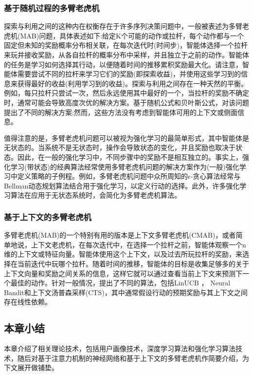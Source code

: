 \subsubsection{基于随机过程的多臂老虎机}
探索与利用之间的这种内在权衡存在于许多序列决策问题中，一般被表述为多臂老虎机(MAB)问题，具体表述如下:给定K个可能的动作或拉杆，每个动作都与一个固定但未知的奖励概率分布相关联，在每次迭代时(时间步)，智能体选择一个拉杆来玩并接收奖励，从各自拉杆的概率分布中采样，并且独立于之前的动作。智能体的任务是学习如何选择其行动，以便随着时间的推移累积奖励最大化。请注意，智能体需要尝试不同的拉杆来学习它们的奖励(即探索收益)，并使用这些学习到的信息来获得最好的收益(利用学习到的收益)。探索与利用之间存在一种天然的平衡。例如，每只拉杆只尝试一次，然后永远使用其中最好的一个，当拉杆的奖励不确定时，通常可能会导致高度次优的解决方案。基于随机公式和贝叶斯公式，对该问题提出了不同的解决方案;然而，这些方法没有考虑到智能体可用的上下文或侧面信息。\par
值得注意的是，多臂老虎机问题可以被视为强化学习的最简单形式，其中智能体是无状态的。当系统不是无状态时，操作会导致状态的变化，并且奖励也取决于状态。因此，在一般的强化学习中，不同步骤中的奖励不是相互独立的。事实上，强化学习(带状态)的经典算法经常使用多臂老虎机问题的解决方案作为(一般)强化学习中定义策略的子例程。例如，多臂老虎机问题中众所周知的$\epsilon$-贪心算法经常与Bellman动态规划算法结合用于强化学习，以定义行动的选择。此外，许多强化学习算法在应用于无状态系统时，会简化为多臂老虎机算法。

\subsubsection{基于上下文的多臂老虎机}
多臂老虎机(MAB)的一个特别有用的版本是上下文多臂老虎机(CMAB)，或者简单地说，上下文老虎机，在每次迭代中，在选择一个拉杆之前，智能体观察一个n维的上下文或特征向量。智能体使用这个上下文，以及过去所玩拉杆的奖励，来选择在当前迭代中玩哪个拉杆。随着时间的推移，智能体的目标是收集足够多的关于上下文向量和奖励之间关系的信息，这样它就可以通过查看当前上下文来预测下一个最佳的动作。针对一般情况，提出了不同的算法，包括LinUCB ， Neural Bandit和上下文汤普森采样(CTS)，其中通常假设行动的预期奖励与其上下文之间存在线性依赖。

\subsection{本章小结}
本章介绍了相关理论技术，包括用户画像技术，深度学习算法和强化学习算法技术，随后对基于注意力机制的神经网络和基于上下文的多臂老虎机作简要介绍，为下文展开做铺垫。

